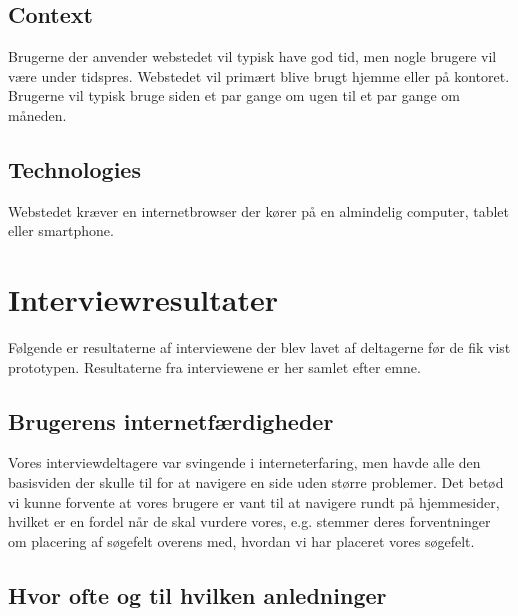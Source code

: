 \documentclass[a4paper, 12pt]{article}
\begin{document}
\subsection{Context}

Brugerne der anvender webstedet vil typisk have god tid, men nogle brugere vil
være under tidspres. Webstedet vil primært blive brugt hjemme eller på kontoret.
Brugerne vil typisk bruge siden et par gange om ugen til et par gange om
måneden.

\subsection{Technologies}

Webstedet kræver en internetbrowser der kører på en almindelig computer, tablet
eller smartphone.

\section{Interviewresultater}
\label{sec:Interviewresultater}
Følgende er resultaterne af interviewene der blev lavet af deltagerne før de fik vist prototypen.
Resultaterne fra interviewene er her samlet efter emne.

\subsection{Brugerens internetfærdigheder}

Vores interviewdeltagere var svingende i interneterfaring, men havde alle den basisviden
der skulle til for at navigere en side uden større problemer. Det betød vi kunne
forvente at vores brugere er vant til at navigere rundt på hjemmesider, hvilket
er en fordel når de skal vurdere vores, e.g. stemmer deres forventninger om
placering af søgefelt overens med, hvordan vi har placeret vores søgefelt.



\subsection{Hvor ofte og til hvilken anledninger}
\end{document}

